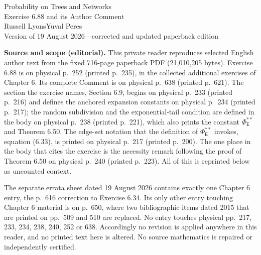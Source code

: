 \documentclass[11pt]{article}
\newcommand{\E}{\mathsf E}
\begin{document}
\begin{center}
{\large Probability on Trees and Networks\\[2pt]Exercise 6.88 and its Author Comment}\\[4pt]
Russell Lyons\quad Yuval Peres\\[2pt]
Version of 19 August 2026---corrected and updated paperback edition
\end{center}

\noindent\textbf{Source and scope (editorial).}
This private reader reproduces selected English author text from the fixed 716-page paperback PDF (21,010,205 bytes). Exercise 6.88 is on physical p.\ 252 (printed p.\ 235), in the collected additional exercises of Chapter 6. Its complete Comment is on physical p.\ 638 (printed p.\ 621). The section the exercise names, Section 6.9, begins on physical p.\ 233 (printed p.\ 216) and defines the anchored expansion constants on physical p.\ 234 (printed p.\ 217); the random subdivision and the exponential-tail condition are defined in the body on physical p.\ 238 (printed p.\ 221), which also prints the constant $\Phi^{**}_{\E}$ and Theorem 6.50. The edge-set notation that the definition of $\Phi^{**}_{\E}$ invokes, equation (6.33), is printed on physical p.\ 217 (printed p.\ 200). The one place in the body that cites the exercise is the necessity remark following the proof of Theorem 6.50 on physical p.\ 240 (printed p.\ 223). All of this is reprinted below as uncounted context.

The separate errata sheet dated 19 August 2026 contains exactly one Chapter 6 entry, the p.\ 616 correction to Exercise 6.34. Its only other entry touching Chapter 6 material is on p.\ 650, where two bibliographic items dated 2015 that are printed on pp.\ 509 and 510 are replaced. No entry touches physical pp.\ 217, 233, 234, 238, 240, 252 or 638. Accordingly no revision is applied anywhere in this reader, and no printed text here is altered. No source mathematics is repaired or independently certified.
\end{document}
